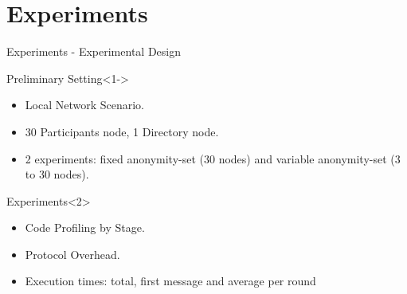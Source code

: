 \section{Experiments}

\begin{frame}{Experiments - Experimental Design}
    
    \begin{block}{Preliminary Setting}<1->
        \begin{itemize}
            \item Local Network Scenario.
            \item 30 Participants node, 1 Directory node.
            \item 2 experiments: fixed anonymity-set (30 nodes) and variable anonymity-set (3 to 30 nodes).
        \end{itemize}
    \end{block}
    
    \begin{block}{Experiments}<2>
        \begin{itemize}
            \item Code Profiling by Stage.
            \item Protocol Overhead.
            \item Execution times: total, first message and average per round
        \end{itemize}
    \end{block}
    
\end{frame}